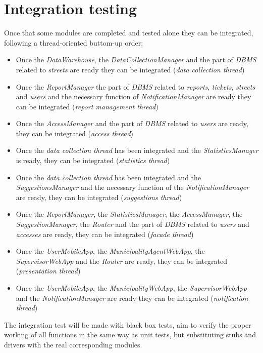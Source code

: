 \documentclass[a4paper]{report}
\begin{document}
\section{Integration testing}
Once that some modules are completed and tested alone they can be integrated, following a thread-oriented buttom-up order:
\begin{itemize}
\item Once the \textit{DataWarehouse}, the \textit{DataCollectionManager} and the part of \textit{DBMS} related to \textit{streets} are ready they can be integrated (\textit{data collection thread})
\item Once the \textit{ReportManager} the part of \textit{DBMS} related to \textit{reports}, \textit{tickets}, \textit{streets} and \textit{users} and the necessary function of \textit{NotificationManager} are ready they can be integrated  (\textit{report management thread})
\item Once the \textit{AccessManager} and the part of \textit{DBMS} related to \textit{users} are ready, they can be integrated (\textit{access thread})
\item Once the \textit{data collection thread} has been integrated and the \textit{StatisticsManager} is ready, they can be integrated  (\textit{statistics thread})
\item Once the \textit{data collection thread} has been integrated and the \textit{SuggestionsManager} and the necessary function of the \textit{NotificationManager} are ready, they can be integrated (\textit{suggestions thread})
\item Once the \textit{ReportManager}, the \textit{StatisticsManager}, the \textit{AccessManager}, the \textit{SuggestionManager}, the \textit{Router} and the part of \textit{DBMS} related to \textit{users} and \textit{accesses} are ready, they can be integrated (\textit{facade thread})
\item Once the \textit{UserMobileApp}, the \textit{MunicipalityAgentWebApp}, the \textit{SupervisorWebApp} and the \textit{Router} are ready, they can be integrated (\textit{presentation thread})
\item Once the \textit{UserMobileApp}, the \textit{MunicipalityWebApp}, the \textit{SupervisorWebApp} and the \textit{NotificationManager} are ready they can be integrated (\textit{notification thread})
\end{itemize}
The integration test will be made with black box tests, aim to verify the proper working of all functions in the same way as unit tests, but substituting stubs and drivers with the real corresponding modules.\\
\end{document}
